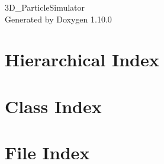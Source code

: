 \documentclass[twoside]{book}
\newcommand{\+}{\discretionary{\mbox{\scriptsize$\hookleftarrow$}}{}{}}
\newcommand{\clearemptydoublepage}{%
    \newpage{\pagestyle{empty}\cleardoublepage}%
  }
\begin{document}
  \raggedbottom
    \hypersetup{pageanchor=false,
                bookmarksnumbered=true,
                pdfencoding=unicode
               }
  \begin{titlepage}
  \vspace*{7cm}
  \begin{center}%
  {\Large 3\+D\+\_\+\+Particle\+Simulator}\\
  \vspace*{1cm}
  {\large Generated by Doxygen 1.10.0}\\
  \end{center}
  \end{titlepage}
  \clearemptydoublepage
  \tableofcontents
  \clearemptydoublepage
  \hypersetup{pageanchor=true}
\chapter{Hierarchical Index}

\chapter{Class Index}

\chapter{File Index}

\end{document}
